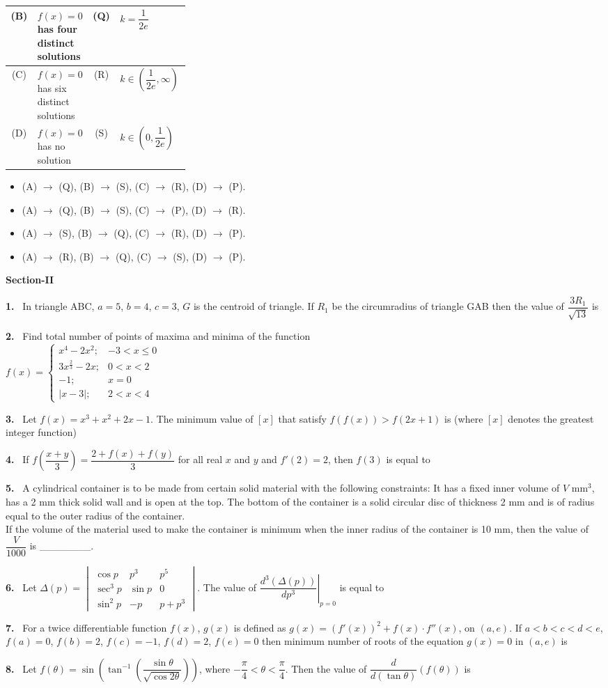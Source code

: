 \documentclass[10pt]{extarticle}
\newcommand{\sect}[1]{\par\smallskip\noindent\textbf{#1}\par}
\newcommand{\qn}[1]{\par\smallskip\noindent\textbf{#1.}~}
\newenvironment{qoptions}{\begin{itemize}[leftmargin=1.8em,itemsep=1pt,topsep=2pt,label={}]}{\end{itemize}}
\newcommand{\opt}[2]{\item[(#1)] #2}
\begin{document}
\begin{multicols}{2}
\begin{center}
\begin{tabular}{|c|p{0.3\linewidth}||c|l|}
(B) & $f(x)=0$ has four distinct solutions & (Q) & $k=\dfrac1{2e}$\\\hline
(C) & $f(x)=0$ has six distinct solutions & (R) & $k\in\left(\dfrac1{2e},\infty\right)$\\\hline
(D) & $f(x)=0$ has no solution & (S) & $k\in\left(0,\dfrac1{2e}\right)$\\\hline
\end{tabular}
\end{center}
\begin{qoptions}
\opt{A}{(A) $\to$ (Q), (B) $\to$ (S), (C) $\to$ (R), (D) $\to$ (P).}
\opt{B}{(A) $\to$ (Q), (B) $\to$ (S), (C) $\to$ (P), (D) $\to$ (R).}
\opt{C}{(A) $\to$ (S), (B) $\to$ (Q), (C) $\to$ (R), (D) $\to$ (P).}
\opt{D}{(A) $\to$ (R), (B) $\to$ (Q), (C) $\to$ (S), (D) $\to$ (P).}
\end{qoptions}
\sect{Section-II}
\qn{1} In triangle ABC, $a=5$, $b=4$, $c=3$, $G$ is the centroid of triangle. If $R_1$ be the circumradius of triangle GAB then the value of $\dfrac{3R_1}{\sqrt{13}}$ is
\qn{2} Find total number of points of maxima and minima of the function\\
$f(x)=\begin{cases}x^4-2x^2; & -3<x\le0\\ 3x^{\frac23}-2x; & 0<x<2\\ -1; & x=0\\ |x-3|; & 2<x<4\end{cases}$
\qn{3} Let $f(x)=x^3+x^2+2x-1$. The minimum value of $[x]$ that satisfy $f(f(x))>f(2x+1)$ is (where $[x]$ denotes the greatest integer function)
\qn{4} If $f\!\left(\dfrac{x+y}{3}\right)=\dfrac{2+f(x)+f(y)}{3}$ for all real $x$ and $y$ and $f'(2)=2$, then $f(3)$ is equal to
\qn{5} A cylindrical container is to be made from certain solid material with the following constraints: It has a fixed inner volume of $V$ mm$^3$, has a 2 mm thick solid wall and is open at the top. The bottom of the container is a solid circular disc of thickness 2 mm and is of radius equal to the outer radius of the container.\\
If the volume of the material used to make the container is minimum when the inner radius of the container is 10 mm, then the value of $\dfrac V{1000}$ is \_\_\_\_\_\_\_.
\qn{6} Let $\Delta(p)=\begin{vmatrix}\cos p & p^3 & p^5\\ \sec^3p & \sin p & 0\\ \sin^2p & -p & p+p^3\end{vmatrix}$. The value of $\left.\dfrac{d^3(\Delta(p))}{dp^3}\right|_{p=0}$ is equal to
\qn{7} For a twice differentiable function $f(x)$, $g(x)$ is defined as $g(x)=\left(f'(x)\right)^2+f(x)\cdot f''(x)$, on $(a,e)$. If $a<b<c<d<e$, $f(a)=0$, $f(b)=2$, $f(c)=-1$, $f(d)=2$, $f(e)=0$ then minimum number of roots of the equation $g(x)=0$ in $(a,e)$ is
\qn{8} Let $f(\theta)=\sin\left(\tan^{-1}\left(\dfrac{\sin\theta}{\sqrt{\cos2\theta}}\right)\right)$, where $-\dfrac\pi4<\theta<\dfrac\pi4$. Then the value of $\dfrac{d}{d(\tan\theta)}(f(\theta))$ is
\end{multicols}
\end{document}
